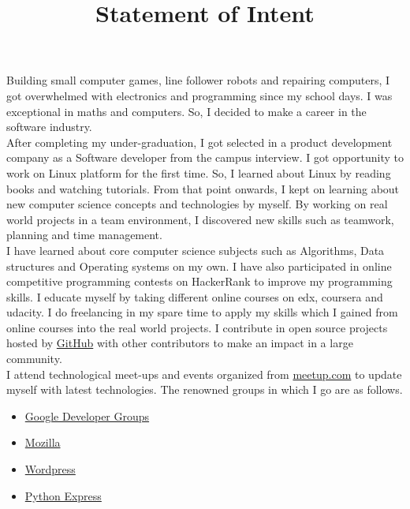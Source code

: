 \documentclass{article}
\title{Statement of Intent}
\author{}
\begin{document}
  \maketitle %

Building small computer games, line follower robots and repairing computers, I got overwhelmed with electronics and programming since my school days. I was exceptional in maths and computers. So, I decided to make a career in the software industry.\\

After completing my under-graduation, I got selected in a product development company as a Software developer from the campus interview. I got opportunity to work on Linux platform for the first time. So, I learned about Linux by reading books and watching tutorials. From that point onwards, I kept on learning about new computer science concepts and technologies by myself. By working on real world projects in a team environment, I discovered new skills such as teamwork, planning and time management.\\

I have learned about core computer science subjects such as Algorithms, Data structures and Operating systems on my own. I have  also participated in online competitive programming contests on HackerRank to improve my programming skills. I educate myself by taking different online courses on edx, coursera and udacity. I do freelancing in my spare time to apply my skills which I gained from online courses into the real world projects. I contribute in open source projects hosted by \href{http://www.GitHub.com/mehul-m-prajapati}{GitHub} with other contributors to make an impact in a large community.\\

I attend technological meet-ups and events organized from \href{www.meetup.com}{meetup.com} to update myself with latest technologies. The renowned groups in which I go are as follows.

\begin{itemize}
   \item \href{https://developers.google.com/groups/chapter/106261089114347152720/}{Google Developer Groups}
   
   \item \href{http://mozillaindia.org/}{Mozilla} 
   
   \item \href{https://www.meetup.com/ahmedabad-wp-meetup/members/72560962/}{Wordpress}
   
   \item \href{https://pythonexpress.in/}{Python Express}
\end{itemize}
\end{document}
